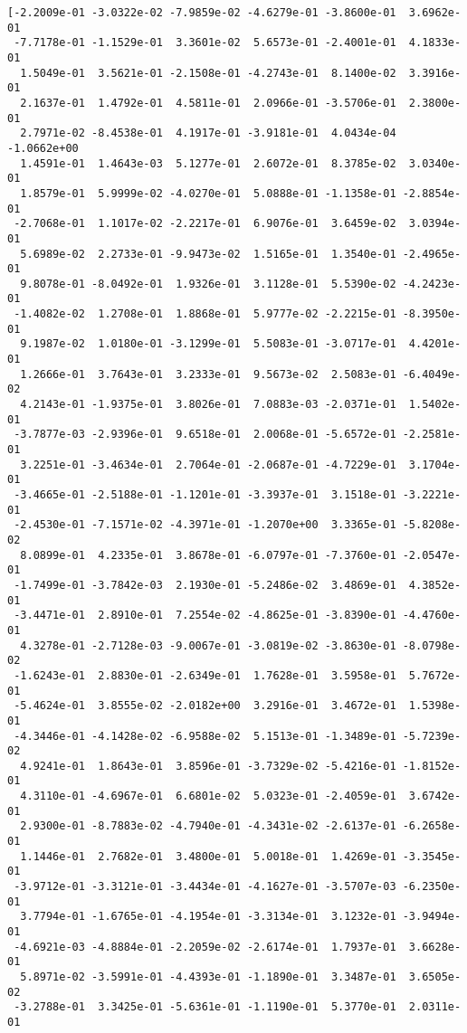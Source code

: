 \documentclass[11pt]{article}
\begin{document}
    \begin{Verbatim}[commandchars=\\\{\}]
[-2.2009e-01 -3.0322e-02 -7.9859e-02 -4.6279e-01 -3.8600e-01  3.6962e-01
 -7.7178e-01 -1.1529e-01  3.3601e-02  5.6573e-01 -2.4001e-01  4.1833e-01
  1.5049e-01  3.5621e-01 -2.1508e-01 -4.2743e-01  8.1400e-02  3.3916e-01
  2.1637e-01  1.4792e-01  4.5811e-01  2.0966e-01 -3.5706e-01  2.3800e-01
  2.7971e-02 -8.4538e-01  4.1917e-01 -3.9181e-01  4.0434e-04 -1.0662e+00
  1.4591e-01  1.4643e-03  5.1277e-01  2.6072e-01  8.3785e-02  3.0340e-01
  1.8579e-01  5.9999e-02 -4.0270e-01  5.0888e-01 -1.1358e-01 -2.8854e-01
 -2.7068e-01  1.1017e-02 -2.2217e-01  6.9076e-01  3.6459e-02  3.0394e-01
  5.6989e-02  2.2733e-01 -9.9473e-02  1.5165e-01  1.3540e-01 -2.4965e-01
  9.8078e-01 -8.0492e-01  1.9326e-01  3.1128e-01  5.5390e-02 -4.2423e-01
 -1.4082e-02  1.2708e-01  1.8868e-01  5.9777e-02 -2.2215e-01 -8.3950e-01
  9.1987e-02  1.0180e-01 -3.1299e-01  5.5083e-01 -3.0717e-01  4.4201e-01
  1.2666e-01  3.7643e-01  3.2333e-01  9.5673e-02  2.5083e-01 -6.4049e-02
  4.2143e-01 -1.9375e-01  3.8026e-01  7.0883e-03 -2.0371e-01  1.5402e-01
 -3.7877e-03 -2.9396e-01  9.6518e-01  2.0068e-01 -5.6572e-01 -2.2581e-01
  3.2251e-01 -3.4634e-01  2.7064e-01 -2.0687e-01 -4.7229e-01  3.1704e-01
 -3.4665e-01 -2.5188e-01 -1.1201e-01 -3.3937e-01  3.1518e-01 -3.2221e-01
 -2.4530e-01 -7.1571e-02 -4.3971e-01 -1.2070e+00  3.3365e-01 -5.8208e-02
  8.0899e-01  4.2335e-01  3.8678e-01 -6.0797e-01 -7.3760e-01 -2.0547e-01
 -1.7499e-01 -3.7842e-03  2.1930e-01 -5.2486e-02  3.4869e-01  4.3852e-01
 -3.4471e-01  2.8910e-01  7.2554e-02 -4.8625e-01 -3.8390e-01 -4.4760e-01
  4.3278e-01 -2.7128e-03 -9.0067e-01 -3.0819e-02 -3.8630e-01 -8.0798e-02
 -1.6243e-01  2.8830e-01 -2.6349e-01  1.7628e-01  3.5958e-01  5.7672e-01
 -5.4624e-01  3.8555e-02 -2.0182e+00  3.2916e-01  3.4672e-01  1.5398e-01
 -4.3446e-01 -4.1428e-02 -6.9588e-02  5.1513e-01 -1.3489e-01 -5.7239e-02
  4.9241e-01  1.8643e-01  3.8596e-01 -3.7329e-02 -5.4216e-01 -1.8152e-01
  4.3110e-01 -4.6967e-01  6.6801e-02  5.0323e-01 -2.4059e-01  3.6742e-01
  2.9300e-01 -8.7883e-02 -4.7940e-01 -4.3431e-02 -2.6137e-01 -6.2658e-01
  1.1446e-01  2.7682e-01  3.4800e-01  5.0018e-01  1.4269e-01 -3.3545e-01
 -3.9712e-01 -3.3121e-01 -3.4434e-01 -4.1627e-01 -3.5707e-03 -6.2350e-01
  3.7794e-01 -1.6765e-01 -4.1954e-01 -3.3134e-01  3.1232e-01 -3.9494e-01
 -4.6921e-03 -4.8884e-01 -2.2059e-02 -2.6174e-01  1.7937e-01  3.6628e-01
  5.8971e-02 -3.5991e-01 -4.4393e-01 -1.1890e-01  3.3487e-01  3.6505e-02
 -3.2788e-01  3.3425e-01 -5.6361e-01 -1.1190e-01  5.3770e-01  2.0311e-01

\end{Verbatim}
\end{document}
